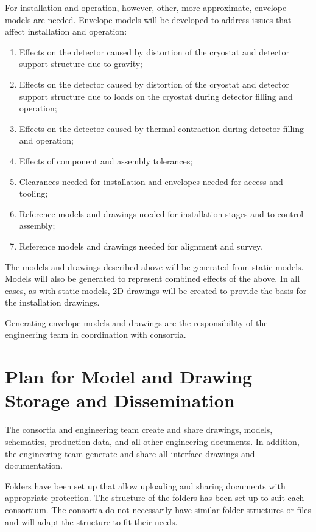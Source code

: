 For installation and operation, however, other, more approximate, envelope models are needed. Envelope models will be developed
to address issues that affect installation and operation:
\begin{enumerate}
 \item Effects on the detector caused by distortion of the cryostat
   and detector support structure due to gravity;
 \item Effects on the detector caused by distortion of the cryostat
   and detector support structure due to loads on the cryostat during detector filling and operation;
 \item Effects on the detector caused by thermal contraction during
   detector filling and operation;
 \item Effects of component and
   assembly tolerances;
 \item Clearances needed for installation and envelopes needed for
   access and tooling;
 \item Reference models and drawings needed for installation stages
   and to control assembly;
 \item Reference models and drawings needed for alignment and survey.
\end{enumerate}




The models and drawings described above will be generated from static
models. Models will also be generated to
represent combined effects of the above. In all cases, as with static models, 2D
drawings will be created to provide the basis for the installation
drawings.


Generating envelope models and drawings are the responsibility of the
 engineering team in coordination with consortia.




\section{Plan for Model and Drawing Storage and Dissemination}
\label{sec:fdsp-coord-integ-modelplan}
The consortia and  engineering team create and share drawings, models, schematics, production data, and all other
engineering documents. In addition, the  engineering team generate and share all interface drawings and
documentation.


Folders have been set up that allow uploading and sharing
documents with appropriate protection. The structure of the folders
has been set up to suit each consortium. The
consortia do not necessarily have similar folder structures or files and will adapt
the structure to fit their needs.


